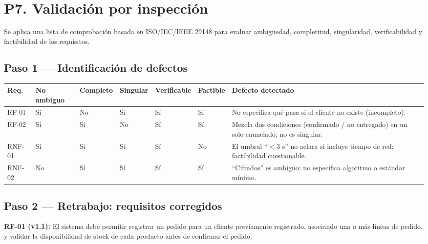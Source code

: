 \documentclass[12pt,a4paper]{article}
\begin{document}

\section{P7. Validación por inspección}

Se aplica una lista de comprobación basada en ISO/IEC/IEEE 29148 para evaluar ambigüedad, completitud, singularidad, verificabilidad y factibilidad de los requisitos.

\subsection{Paso 1 — Identificación de defectos}

\begin{longtable}{p{1.5cm}p{1.5cm}p{1.5cm}p{1.5cm}p{1.5cm}p{1.5cm}p{5cm}}
\toprule
\textbf{Req.} &
\textbf{No ambiguo} &
\textbf{Completo} &
\textbf{Singular} &
\textbf{Verificable} &
\textbf{Factible} &
\textbf{Defecto detectado} \\
\midrule

RF-01 & Sí & No & Sí & Sí & Sí &
No especifica qué pasa si el cliente no existe (incompleto). \\

RF-02 & Sí & Sí & No & Sí & Sí &
Mezcla dos condiciones (confirmado / no entregado) en un solo enunciado; no es singular. \\

RNF-01 & Sí & Sí & Sí & Sí & No &
El umbral ``$<3$ s'' no aclara si incluye tiempo de red; factibilidad cuestionable. \\

RNF-02 & No & Sí & Sí & Sí & Sí &
``Cifrados'' es ambiguo: no especifica algoritmo o estándar mínimo. \\

\bottomrule
\end{longtable}

\subsection{Paso 2 — Retrabajo: requisitos corregidos}

\textbf{RF-01 (v1.1):} El sistema debe permitir registrar un pedido para un cliente previamente registrado, asociando una o más líneas de pedido, y validar la disponibilidad de stock de cada producto antes de confirmar el pedido.

\medskip
\end{document}
